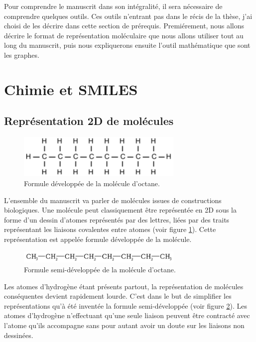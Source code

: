 Pour comprendre le manuscrit dans son intégralité, il sera nécessaire de comprendre quelques outils.
Ces outils n'entrant pas dans le récis de la thèse, j'ai choisi de les décrire dans cette section de prérequis.
Premiérement, nous allons décrire le format de représentation moléculaire que nous allons utiliser tout au long du manuscrit, puis nous expliquerons ensuite l'outil mathématique que sont les graphes.

\section{Chimie et SMILES}

\subsection{Représentation 2D de molécules}

\begin{figure}[h!]
  \begin{center}
    \includegraphics[width=300px]{Figures/Prerequis/developpee.png}
    \caption{\label{dev}Formule développée de la molécule d'octane.}
  \end{center}
\end{figure}

L'ensemble du manuscrit va parler de molécules issues de constructions biologiques.
Une molécule peut classiquement être représentée en 2D sous la forme d'un dessin d'atomes représentés par des lettres, liées par des traits représentant les liaisons covalentes entre atomes (voir figure \ref{dev}).
Cette représentation est appelée formule développée de la molécule.

\begin{figure}[h!]
  \begin{center}
    \includegraphics[width=300px]{Figures/Prerequis/semi.png}
    \caption{\label{semi}Formule semi-développée de la molécule d'octane.}
  \end{center}
\end{figure}

Les atomes d'hydrogène étant présents partout, la représentation de molécules conséquentes devient rapidement lourde.
C'est dans le but de simplifier les représentations qu'à été inventée la formule semi-développée (voir figure \ref{semi}).
Les atomes d'hydrogène n'effectuant qu'une seule liaison peuvent être contracté avec l'atome qu'ils accompagne sans pour autant avoir un doute sur les liaisons non dessinées.


